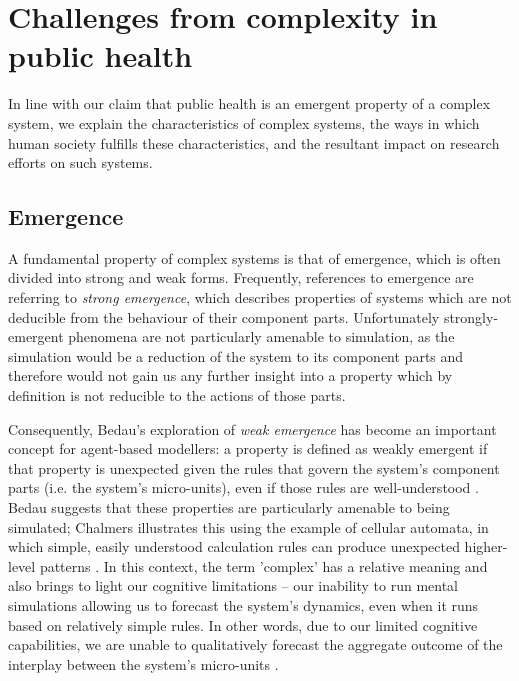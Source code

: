 \documentclass[review]{elsarticle}
\begin{document}

\section{Challenges from complexity in public health}

In line with our claim that public health is an emergent property of a complex system, we explain the characteristics of complex systems, the ways in which human society fulfills these characteristics, and the resultant impact on research efforts on such systems. 
 
\subsection{Emergence}
A fundamental property of complex systems is that of emergence, which is often divided into strong and weak forms.  Frequently, references to emergence are referring to \emph{strong emergence}, which describes properties of systems which are not deducible from the behaviour of their component parts. Unfortunately strongly-emergent phenomena are not particularly amenable to simulation, as the simulation would be a reduction of the system to its component parts and therefore would not gain us any further insight into a property which by definition is not reducible to the actions of those parts.

Consequently, Bedau's exploration of \emph{weak emergence} has become an important concept for agent-based modellers: a property is defined as weakly emergent if that property is unexpected given the rules that govern the system's component parts (i.e. the system's micro-units), even if those rules are well-understood \citep{bedau97b}.  Bedau suggests that these properties are particularly amenable to being simulated; Chalmers illustrates this using the example of cellular automata, in which simple, easily understood calculation rules can produce unexpected higher-level patterns \citep{chalmers2006}. In this context, the term 'complex' has a relative meaning and also brings to light our cognitive limitations -- our inability to run mental simulations allowing us to forecast the system's dynamics, even when it runs based on relatively simple rules. In other words, due to our limited cognitive capabilities, we are unable to qualitatively forecast the aggregate outcome of the interplay between the system's micro-units \citep{berkman2011}.
\end{document}
